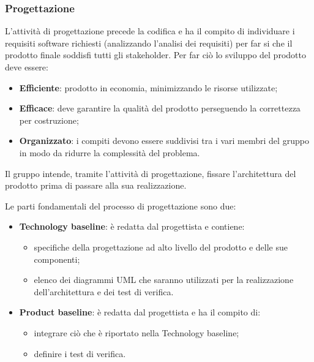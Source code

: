\subsubsection{Progettazione}
L'attività di progettazione precede la codifica e ha il compito di individuare i requisiti software richiesti (analizzando l'analisi dei requisiti) per far si che il prodotto finale soddisfi tutti gli stakeholder. Per far ciò lo sviluppo del prodotto deve essere:
\begin{itemize}
\item \textbf{Efficiente}: prodotto in economia, minimizzando le risorse utilizzate;
\item \textbf{Efficace}: deve garantire la qualità del prodotto perseguendo la correttezza per costruzione;
\item \textbf{Organizzato}: i compiti devono essere suddivisi tra i vari membri del gruppo in modo da ridurre la complessità del problema.
\end{itemize}

Il gruppo \Omicron{} intende, tramite l'attività di progettazione, fissare l'architettura del prodotto prima di passare alla sua realizzazione. 

Le parti fondamentali del processo di progettazione sono due:
\begin{itemize}
\item \textbf{Technology baseline}: è redatta dal progettista e contiene:
\begin{itemize}
\item specifiche della progettazione ad alto livello del prodotto e delle sue componenti;
\item elenco dei diagrammi UML che saranno utilizzati per la realizzazione dell'architettura e dei test di verifica.
\end{itemize}
\item \textbf{Product baseline}: è redatta dal progettista e ha il compito di:
\begin{itemize}
\item integrare ciò che è riportato nella Technology baseline;
\item definire i test di verifica.
\end{itemize}
\end{itemize} 

